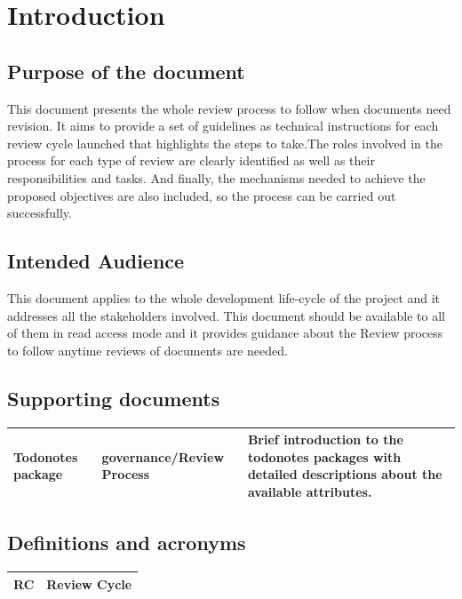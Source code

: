 \documentclass{template/openetcs_article}
\begin{document}
\newpage

\section{Introduction}

\subsection[Introduction]{Purpose of the document}
This document presents the whole review process to follow when documents need revision. It aims to provide a set of guidelines as technical instructions for each review cycle launched that highlights the steps to take.The roles involved in the process for each type of review are clearly identified as well as their responsibilities and tasks. And finally, the mechanisms needed to achieve the proposed objectives are also included, so the process can be carried out successfully.

\subsection{Intended Audience}
This document applies to the whole development life-cycle of the project and it addresses all the stakeholders involved. This document should be available to all of them in read access mode and it provides guidance about the Review process to follow anytime reviews of documents are needed.

\subsection{Supporting documents}
\tablehead{}
\tabletail{}
\tablelasttail{}
\begin{supertabular}{|m{2cm}m{3cm}m{9cm}|}
\hline
Todonotes package &
governance/Review Process &
Brief introduction to the todonotes packages with detailed descriptions about the available attributes. 
\\\hline
\end{supertabular}


\subsection{Definitions and acronyms}
\tablehead{}
\tabletail{}
\tablelasttail{}
\begin{supertabular}{|m{3cm}m{11cm}|}
\hline
RC &
Review Cycle\\\hline
\end{supertabular}
\end{document}
